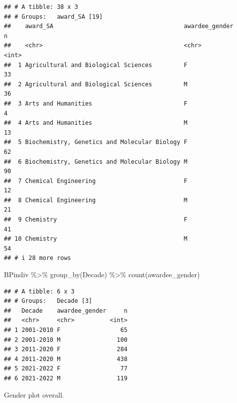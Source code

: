 \documentclass[
]{article}
\newenvironment{Shaded}{\begin{snugshade}}{\end{snugshade}}
\newcommand{\FunctionTok}[1]{\textcolor[rgb]{0.00,0.00,0.00}{#1}}
\newcommand{\NormalTok}[1]{#1}
\newcommand{\SpecialCharTok}[1]{\textcolor[rgb]{0.00,0.00,0.00}{#1}}
\begin{document}
\begin{verbatim}
## # A tibble: 38 x 3
## # Groups:   award_SA [19]
##    award_SA                                     awardee_gender     n
##    <chr>                                        <chr>          <int>
##  1 Agricultural and Biological Sciences         F                 33
##  2 Agricultural and Biological Sciences         M                 36
##  3 Arts and Humanities                          F                  4
##  4 Arts and Humanities                          M                 13
##  5 Biochemistry, Genetics and Molecular Biology F                 62
##  6 Biochemistry, Genetics and Molecular Biology M                 90
##  7 Chemical Engineering                         F                 12
##  8 Chemical Engineering                         M                 21
##  9 Chemistry                                    F                 41
## 10 Chemistry                                    M                 54
## # i 28 more rows
\end{verbatim}

\begin{Shaded}
\begin{Highlighting}[]
\NormalTok{BPindiv }\SpecialCharTok{\%\textgreater{}\%} 
  \FunctionTok{group\_by}\NormalTok{(Decade) }\SpecialCharTok{\%\textgreater{}\%}
  \FunctionTok{count}\NormalTok{(awardee\_gender)}
\end{Highlighting}
\end{Shaded}

\begin{verbatim}
## # A tibble: 6 x 3
## # Groups:   Decade [3]
##   Decade    awardee_gender     n
##   <chr>     <chr>          <int>
## 1 2001-2010 F                 65
## 2 2001-2010 M                100
## 3 2011-2020 F                284
## 4 2011-2020 M                438
## 5 2021-2022 F                 77
## 6 2021-2022 M                119
\end{verbatim}

Gender plot overall.
\end{document}
